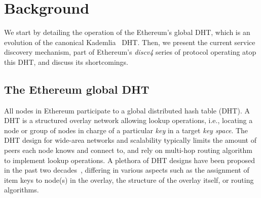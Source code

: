 

\section{Background}
\label{sec:background}

We start by detailing the operation of the Ethereum's global DHT, which is an evolution of the canonical Kademlia~\cite{maymounkov2002kademlia} DHT.
Then, we present the current service discovery mechanism, part of Ethereum's \emph{discv4} series of protocol operating atop this DHT, and discuss its shortcomings.

\subsection{The Ethereum global DHT}
\label{sec:background:dht}

All nodes in Ethereum participate to a global distributed hash table (DHT).
A DHT is a structured overlay network allowing lookup operations, i.e., locating a node or group of nodes in charge of a particular \emph{key} in a target \emph{key space}.
The DHT design for wide-area networks and scalability typically limits the amount of peers each node knows and connect to, and rely on multi-hop routing algorithm to implement lookup operations.
A plethora of DHT designs have been proposed in the past two decades~\cite{chord,rowstron2001pastry}, differing in various aspects such as the assignment of item keys to node(s) in the overlay, the structure of the overlay itself, or routing algorithms.

